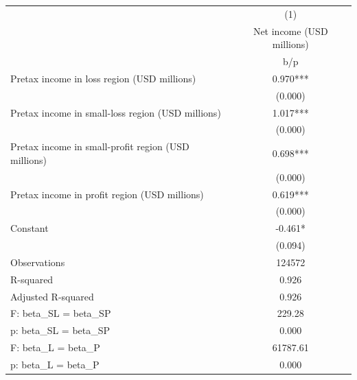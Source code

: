 {
\def\sym#1{\ifmmode^{#1}\else\(^{#1}\)\fi}
\begin{tabular}{l*{1}{c}}
\hline\hline
                    &\multicolumn{1}{c}{(1)}\\
                    &\multicolumn{1}{c}{Net income (USD millions)}\\
                    &         b/p   \\
\hline
Pretax income in loss region (USD millions)&       0.970***\\
                    &     (0.000)   \\
Pretax income in small-loss region (USD millions)&       1.017***\\
                    &     (0.000)   \\
Pretax income in small-profit region (USD millions)&       0.698***\\
                    &     (0.000)   \\
Pretax income in profit region (USD millions)&       0.619***\\
                    &     (0.000)   \\
Constant            &      -0.461*  \\
                    &     (0.094)   \\
\hline
Observations        &      124572   \\
R-squared           &       0.926   \\
Adjusted R-squared  &       0.926   \\
F: beta\_SL = beta\_SP&      229.28   \\
p: beta\_SL = beta\_SP&       0.000   \\
F: beta\_L = beta\_P  &    61787.61   \\
p: beta\_L = beta\_P  &       0.000   \\
\hline\hline
\end{tabular}
}

